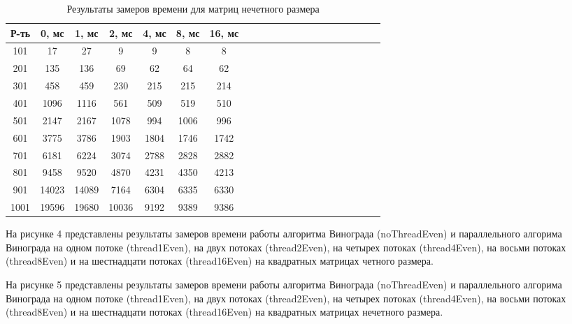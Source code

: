 \documentclass[a4paper,14pt]{report}
\begin{document}
\begin{table}
	\caption{Результаты замеров времени для матриц нечетного размера}
	\tabcolsep=0.11cm
		\begin{tabular}{|c | c | c | c | c | c | c | c | c | c | c | c | c | c | c | c | c | c | c | c | c |}
	 	\hline
		Р-ть & 0, мс & 1, мс & 2, мс & 4, мс & 8, мс & 16, мс \\ [0.5ex]
	 	\hline\hline
		101 & 17 & 27 & 9 & 9 & 8 & 8 \\ \hline
		201 & 135 & 136 & 69 & 62 & 64 & 62 \\ \hline
		301 & 458 & 459 & 230 & 215 & 215 & 214 \\ \hline
		401 & 1096 & 1116 & 561 & 509 & 519 & 510 \\ \hline
		501 & 2147 & 2167 & 1078 & 994 & 1006 & 996 \\ \hline
		601 & 3775 & 3786 & 1903 & 1804 & 1746 & 1742 \\ \hline
		701 & 6181 & 6224 & 3074 & 2788 & 2828 & 2882 \\ \hline
		801 & 9458 & 9520 & 4870 & 4231 & 4350 & 4213 \\ \hline
		901 & 14023 & 14089 & 7164 & 6304 & 6335 & 6330 \\ \hline
		1001 & 19596 & 19680 & 10036 & 9192 & 9389 & 9386 \\ \hline
	\end{tabular}
\end{table}

\newpage

На рисунке 4 представлены результаты замеров времени работы алгоритма Винограда (noThreadEven) и параллельного алгорима Винограда на одном потоке (thread1Even), на двух потоках (thread2Even), на четырех потоках (thread4Even), на восьми потоках (thread8Even) и на шестнадцати потоках (thread16Even) на квадратных матрицах четного размера.

На рисунке 5 представлены результаты замеров времени работы алгоритма Винограда (noThreadEven) и параллельного алгорима Винограда на одном потоке (thread1Even), на двух потоках (thread2Even), на четырех потоках (thread4Even), на восьми потоках (thread8Even) и на шестнадцати потоках (thread16Even) на квадратных матрицах нечетного размера.
\end{document}
